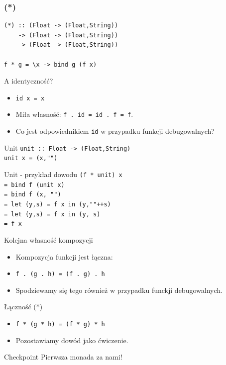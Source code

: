 \documentclass[14pt]{beamer}
\begin{document}
\begin{frame}[fragile]
\frametitle{(*)}
\begin{verbatim}
(*) :: (Float -> (Float,String))
    -> (Float -> (Float,String))
    -> (Float -> (Float,String))

f * g = \x -> bind g (f x)
\end{verbatim}
\end{frame}

\begin{frame}{A identyczność?}
    \begin{itemize}
        \item \texttt{id x = x}
        \item Miła własność: \texttt{f . id = id . f = f}.
        \item Co jest odpowiednikiem \texttt{id} w przypadku
            funkcji debugowalnych?
    \end{itemize}
\end{frame}

\begin{frame}{Unit}
    \texttt{unit :: Float -> (Float,String)\\
    unit x = (x,"")}
\end{frame}

\begin{frame}{Unit - przykład dowodu}
    \texttt{(f * unit) x\\
        = bind f (unit x)\\
        = bind f (x, "")\\
        = let (y,s) = f x in (y,""++s)\\
        = let (y,s) = f x in (y, s)\\
        = f x
    }
\end{frame}

\begin{frame}{Kolejna własność kompozycji}
    \begin{itemize}
        \item Kompozycja funkcji jest łączna:
        \item \texttt{f . (g . h) = (f . g) . h}
        \item Spodziewamy się tego również w przypadku funckji debugowalnych.
    \end{itemize}
\end{frame}

\begin{frame}{Łączność (*)}
    \begin{itemize}
        \item \texttt{f * (g * h) = (f * g) * h}
        \pause
        \item Pozostawiamy dowód jako ćwiczenie.
    \end{itemize}
\end{frame}

\begin{frame}{Checkpoint}
    Pierwsza monada za nami!
\end{frame}
\end{document}
